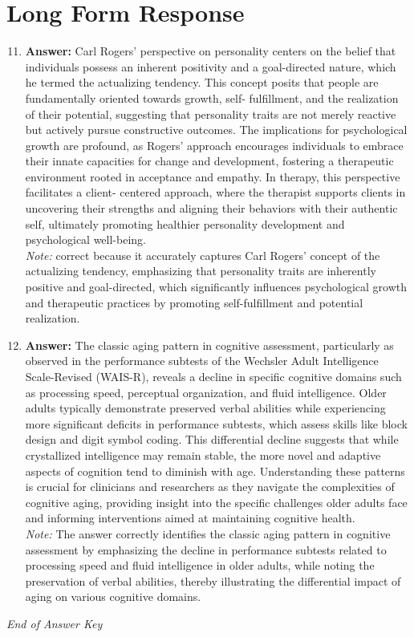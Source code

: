 \documentclass[12pt]{article}
\begin{document}
\section*{Long Form Response}
\begin{enumerate}[label=\arabic*.]
\setcounter{enumi}{10}
\item \textbf{Answer:} Carl Rogers' perspective on personality centers on the belief that individuals possess an inherent positivity and a goal-directed nature, which he termed the actualizing tendency. This concept posits that people are fundamentally oriented towards growth, self- fulfillment, and the realization of their potential, suggesting that personality traits are not merely reactive but actively pursue constructive outcomes. The implications for psychological growth are profound, as Rogers' approach encourages individuals to embrace their innate capacities for change and development, fostering a therapeutic environment rooted in acceptance and empathy. In therapy, this perspective facilitates a client- centered approach, where the therapist supports clients in uncovering their strengths and aligning their behaviors with their authentic self, ultimately promoting healthier personality development and psychological well-being.
\\ \textit{Note:} correct because it accurately captures Carl Rogers' concept of the actualizing tendency, emphasizing that personality traits are inherently positive and goal-directed, which significantly influences psychological growth and therapeutic practices by promoting self-fulfillment and potential realization.
\item \textbf{Answer:} The classic aging pattern in cognitive assessment, particularly as observed in the performance subtests of the Wechsler Adult Intelligence Scale-Revised (WAIS-R), reveals a decline in specific cognitive domains such as processing speed, perceptual organization, and fluid intelligence. Older adults typically demonstrate preserved verbal abilities while experiencing more significant deficits in performance subtests, which assess skills like block design and digit symbol coding. This differential decline suggests that while crystallized intelligence may remain stable, the more novel and adaptive aspects of cognition tend to diminish with age. Understanding these patterns is crucial for clinicians and researchers as they navigate the complexities of cognitive aging, providing insight into the specific challenges older adults face and informing interventions aimed at maintaining cognitive health.
\\ \textit{Note:} The answer correctly identifies the classic aging pattern in cognitive assessment by emphasizing the decline in performance subtests related to processing speed and fluid intelligence in older adults, while noting the preservation of verbal abilities, thereby illustrating the differential impact of aging on various cognitive domains.
\end{enumerate}

\vfill
\noindent\textit{End of Answer Key}
\end{document}
